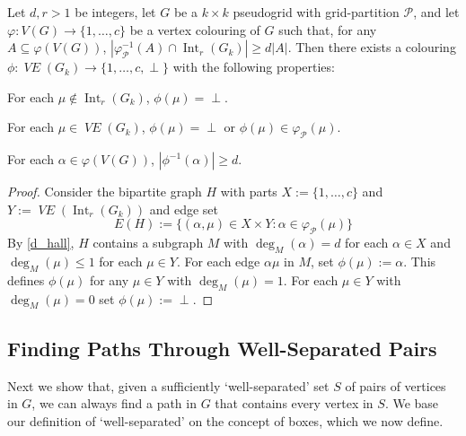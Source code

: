 \documentclass{patmorin}
\DeclareMathOperator{\interior}{Int}
\DeclareMathOperator{\VE}{\mathit{VE}}
\begin{document}
\begin{lem}\label{one_colour_per_object}
  Let $d,r>1$ be integers, let $G$ be a $k\times k$ pseudogrid with grid-partition $\mathcal{P}$, and let $\varphi:V(G)\to\{1,\ldots,c\}$ be a vertex colouring of $G$ such that, for any $A\subseteq\varphi(V(G))$, $|\varphi_{\mathcal{P}}^{-1}(A)\cap\interior_r(G_k)| \ge d|A|$. Then there exists a colouring $\phi:\VE(G_{k})\to\{1,\ldots,c,\perp\}$ with the following properties:
  \begin{compactenum}[(i)]
    \item For each $\mu\not\in\interior_r(G_{k})$, $\phi(\mu)=\perp$.
    \item For each $\mu\in\VE(G_{k})$, $\phi(\mu)=\perp$ or $\phi(\mu)\in\varphi_\mathcal{P}(\mu)$.
    \item For each $\alpha\in\varphi(V(G))$,
    $|\phi^{-1}(\alpha)|\ge d$.
  \end{compactenum}
\end{lem}

\begin{proof}
  Consider the bipartite graph $H$ with parts $X:=\{1,\ldots,c\}$ and $Y:=\VE(\interior_r(G_k))$ and edge set
  \[
    E(H) := \{ (\alpha,\mu)\in X\times Y: \alpha\in\varphi_\mathcal{P}(\mu) \}
  \]
  By \cref{d_hall}, $H$ contains a subgraph $M$ with $\deg_M(\alpha)=d$ for each $\alpha\in X$ and $\deg_M(\mu)\le 1$ for each $\mu\in Y$.  For each edge $\alpha\mu$ in $M$, set $\phi(\mu):=\alpha$.  This defines $\phi(\mu)$ for any $\mu\in Y$ with $\deg_M(\mu)=1$.  For each $\mu\in Y$ with $\deg_M(\mu)=0$ set $\phi(\mu):=\perp$.
\end{proof}

\subsection{Finding Paths Through Well-Separated Pairs}
\label{path_finding}

Next we show that, given a sufficiently `well-separated' set $S$ of pairs of vertices in $G$, we can always find a path in $G$ that contains every vertex in $S$.
We base our definition of `well-separated' on the concept of boxes, which we now define.
\end{document}
